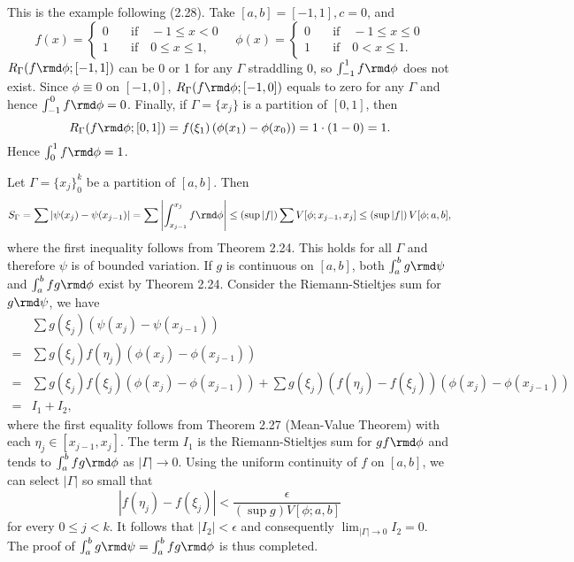 \begin{exercise}{2.14}
  This is the example following (2.28).
  Take $[a,b] = [-1, 1], c=0$, and
  \[
    f(x) = \left\{
    \begin{aligned}
      0 & \quad \text{if} \quad -1 \le x < 0 \\
      1 & \quad \text{if} \quad 0 \le x \le 1,
    \end{aligned}
    \right.
    \quad
    \phi(x) = \left\{
    \begin{aligned}
      0 & \quad \text{if} \quad -1 \le x \le 0 \\
      1 & \quad \text{if} \quad 0 < x \le 1.
    \end{aligned}
    \right.
  \]
  $R_\Gamma(f\rmd \phi; [-1, 1])$ can be 0 or 1 for any $\Gamma$ straddling $0$,
  so $\int_{-1}^1 f\rmd \phi$ does not exist.
  Since $\phi \equiv 0$ on $[-1, 0]$,
  $R_\Gamma(f \rmd \phi; [-1, 0])$ equals to zero for any $\Gamma$
  and hence $\int_{-1}^0 f \rmd \phi = 0$.
  Finally, if $\Gamma = \{x_j\}$ is a partition of $[0, 1]$, then
  \[
    R_\Gamma(f \rmd \phi; [0, 1]) = f(\xi_1) \left( \phi(x_1) - \phi(x_0) \right)
    = 1 \cdot (1-0) = 1.
  \]
  Hence $\int_0^1 f \rmd \phi = 1$.
\end{exercise}

\begin{exercise}{2.15}
  Let $\Gamma = \{x_j\}_0^k$ be a partition of $[a,b]$. Then
  \[
    S_\Gamma = \sum \left\vert \psi(x_j) - \psi(x_{j-1}) \right\vert
    = \sum \left\vert \int_{x_{j-1}}^{x_j} f \rmd \phi \right\vert
    \le \left(\sup |f|\right) \sum V[\phi; x_{j-1}, x_j]
    \le \left(\sup |f|\right) V[\phi; a,b],
  \]
  where the first inequality follows from Theorem 2.24.
  This holds for all $\Gamma$ and therefore $\psi$ is of bounded variation.
  If $g$ is continuous on $[a,b]$,
  both $\int_a^b g \rmd \psi$ and $\int_a^b fg \rmd \phi$ exist
  by Theorem 2.24.
  Consider the Riemann-Stieltjes sum for $g \rmd \psi$, we have
  \begin{align*}
    & \sum g(\xi_j) \left( \psi(x_j) - \psi(x_{j-1}) \right) \\
    = & \sum g(\xi_j) f(\eta_j) \left( \phi(x_j) - \phi(x_{j-1}) \right) \\
    = & \sum g(\xi_j) f(\xi_j) \left( \phi(x_j) - \phi(x_{j-1}) \right)
    + \sum g(\xi_j) \left( f(\eta_j) - f(\xi_j) \right)
    \left( \phi(x_j) - \phi(x_{j-1}) \right) \\
    = & I_1 + I_2,
  \end{align*}
  where the first equality follows from Theorem 2.27 (Mean-Value Theorem)
  with each $\eta_j \in [x_{j-1}, x_j]$.
  The term $I_1$ is the Riemann-Stieltjes sum for $gf \rmd \phi$
  and tends to $\int_a^b fg \rmd \phi$ as $|\Gamma| \rightarrow 0$.
  Using the uniform continuity of $f$ on $[a,b]$,
  we can select $|\Gamma|$ so small that
  \[
    \left\vert f(\eta_j) - f(\xi_j) \right\vert <
    \frac{\epsilon} {\left( \sup g \right) V[\phi; a,b]}
  \]
  for every $0 \le j < k$.
  It follows that $|I_2| < \epsilon$
  and consequently $\lim_{|\Gamma| \rightarrow 0} I_2 = 0$.
  The proof of $\int_a^b g \rmd \psi = \int_a^b fg \rmd \phi$ is thus completed.
\end{exercise}

